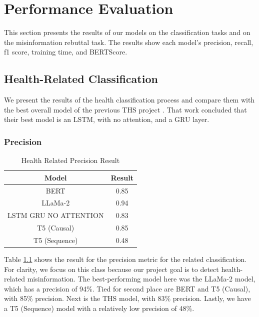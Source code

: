


\chapter{Performance Evaluation}  
This section presents the results of our models on the classification tasks and on the misinformation rebuttal task. The results show each model's precision, recall, f1 score, training time, and BERTScore.


\section{Health-Related Classification}
We present the results of the health classification process and compare them with the best overall model of the previous THS project \cite{8622504}. That work concluded
that their best model is an LSTM, with no attention, and a GRU layer.

\subsection{Precision}
\begin{table}[H]
	\centering
	\caption{Health Related Precision Result}
	\begin{tabular}{||c | c||} 
		\hline
		\textbf{Model} & \textbf{Result} \\ [0.5ex] 
		\hline
		BERT & 0.85  \\
		\hline
		LLaMa-2 & 0.94 \\ 
		\hline
		LSTM GRU NO ATTENTION & 0.83  \\
		\hline
		T5 (Causal) & 0.85 \\
		\hline
		T5 (Sequence) & 0.48 \\
		\hline
	\end{tabular}
	\label{table:HealthPrecision}
\end{table}

Table \ref{table:HealthPrecision} shows the result for the precision metric for the related classification. For clarity, we focus on this class because our project
goal is to detect health-related misinformation. The best-performing model here was the LLaMa-2 model, which has a precision of 94\%. Tied for second place
are BERT and T5 (Causal), with 85\% precision. Next is the THS model, with 83\% precision. Lastly, we have a T5 (Sequence) model with a relatively low
precision of 48\%.

